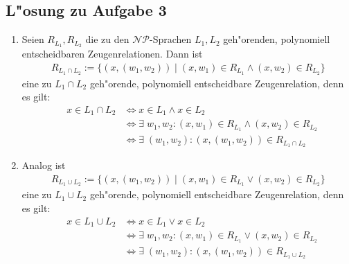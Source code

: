 \documentclass[10pt,oneside,onecolumn,a4paper,german,titlepage]{article}
\begin{document}
\subsection*{L"osung zu Aufgabe 3}
\begin{enumerate}
\item
Seien $R_{L_1}, R_{L_2}$ die zu den $\mathcal{NP}$-Sprachen $L_1, L_2$ geh"orenden,
polynomiell entscheidbaren Zeugenrelationen. Dann ist
\begin{eqnarray*}
R_{L_1 \cap L_2} := \{(x,(w_1,w_2)) \; | \; (x,w_1) \in R_{L_1} \wedge (x,w_2) \in
R_{L_2}\}
\end{eqnarray*}
eine zu $L_1 \cap L_2$ geh"orende, polynomiell entscheidbare Zeugenrelation, denn es
gilt:
\begin{eqnarray*}
&x \in L_1 \cap L_2 &\Leftrightarrow x \in L_1 \wedge x \in L_2\\
&&\Leftrightarrow \exists \; w_1,w_2: (x,w_1) \in R_{L_1} \wedge (x,w_2) \in R_{L_2}\\
&&\Leftrightarrow \exists \; (w_1,w_2): (x,(w_1,w_2)) \in R_{L_1 \cap L_2}
\end{eqnarray*}

\newpage

\item
Analog ist
\begin{eqnarray*}
R_{L_1 \cup L_2} := \{(x,(w_1,w_2)) \; | \; (x,w_1) \in R_{L_1} \vee (x,w_2) \in
R_{L_2}\}
\end{eqnarray*}
eine zu $L_1 \cup L_2$ geh"orende, polynomiell entscheidbare Zeugenrelation, denn es
gilt:
\begin{eqnarray*}
&x \in L_1 \cup L_2 &\Leftrightarrow x \in L_1 \vee x \in L_2\\
&&\Leftrightarrow \exists \; w_1,w_2: (x,w_1) \in R_{L_1} \vee (x,w_2) \in R_{L_2}\\
&&\Leftrightarrow \exists \; (w_1,w_2): (x,(w_1,w_2)) \in R_{L_1 \cup L_2}
\end{eqnarray*}
\end{enumerate}
\end{document}
